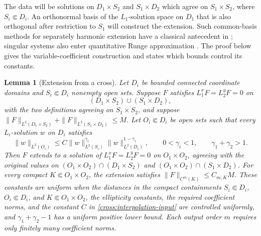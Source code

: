 \documentclass[11pt,a4paper]{article}
\newtheorem{lemma}[theorem]{Lemma}
\theoremstyle{definition}
\theoremstyle{remark}
\numberwithin{equation}{section}
\begin{document}
The data will be solutions on $D_1\times S_2$ and
$S_1\times D_2$ which agree on $S_1\times S_2$, where
$S_i\Subset D_i$. An orthonormal basis of the $L_1$-solution space
on $D_1$ that is also orthogonal after restriction to $S_1$ will
construct the extension. Such common-basis methods for separately
harmonic extension have a classical antecedent in
\citet{Zeriahi1982}; singular systems also enter quantitative Runge
approximation \cite{RulandSalo2019}. The proof below gives the
variable-coefficient construction and states which bounds control
its constants.

\begin{lemma}[Extension from a cross]\label{cross:series}
Let $D_i$ be bounded connected coordinate domains and
$S_i\Subset D_i$ nonempty open sets. Suppose $F$ satisfies
$L_1^xF=L_2^yF=0$ on
\[
 (D_1\times S_2)\cup(S_1\times D_2),
\]
with the two definitions agreeing on $S_1\times S_2$, and suppose
$\|F\|_{L^2(D_1\times S_2)}+
\|F\|_{L^2(S_1\times D_2)}\le M$.
Let $O_i\Subset D_i$ be open sets such that every $L_i$-solution $w$
on $D_i$ satisfies
\begin{equation}\label{cross:interpolation-input}
 \|w\|_{L^2(O_i)}
 \le C\|w\|_{L^2(S_i)}^{\gamma_i}
          \|w\|_{L^2(D_i)}^{1-\gamma_i},
 \qquad 0<\gamma_i<1,\qquad \gamma_1+\gamma_2>1.
\end{equation}
Then $F$ extends to a solution of $L_1^xF=L_2^yF=0$ on
$O_1\times O_2$, agreeing with the original values on
$(O_1\times O_2)\cap(D_1\times S_2)$ and
$(O_1\times O_2)\cap(S_1\times D_2)$. For every compact
$K\Subset O_1\times O_2$, the extension satisfies
$\|F\|_{C^m(K)}\le C_{m,K}M$.
These constants are uniform when the distances in the compact
containments $S_i\Subset D_i$, $O_i\Subset D_i$, and
$K\Subset O_1\times O_2$, the ellipticity constants, the required
coefficient norms, and the constant $C$ in
\eqref{cross:interpolation-input} are controlled uniformly, and
$\gamma_1+\gamma_2-1$ has a uniform positive lower bound.
Each output order $m$ requires only finitely many coefficient norms.
\end{lemma}
\end{document}
